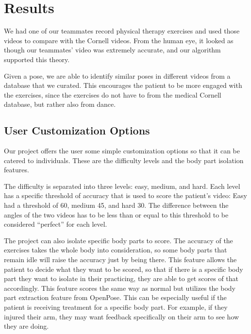 \section{Results}
\label{sec:results}

\indent We had one of our teammates record physical therapy exercises and used those videos to compare with 
the Cornell videos. From the human eye, it looked as though our teammates' video was extremely accurate, and 
our algorithm supported this theory.  

\indent Given a pose, we are able to identify similar poses in different videos from a database that we 
curated. This encourages the patient to be more engaged with the exercises, since the exercises do not have to 
 from the medical Cornell database, but rather also from dance.

\subsection{User Customization Options}
\indent Our project offers the user some simple customization options so that it can be catered to individuals. 
These are the difficulty levels and the body part isolation features.

\indent The difficulty is separated into three levels: easy, medium, and hard. Each level has a specific threshold 
of accuracy that is used to score the patient's video: Easy had a threshold of 60, medium 45, and hard 30. The 
difference between the angles of the two videos has to be less than or equal to this threshold to be considered “perfect” for each level. 

\indent The project can also isolate specific body parts to score. The accuracy of the exercises takes the whole body into consideration, 
so some body parts that remain idle will raise the accuracy just by being there. This feature allows the patient to decide 
what they want to be scored, so that if there is a specific body part they want to isolate in their practicing, they are 
able to get scores of that accordingly. This feature scores the same way as normal but utilizes the body part extraction feature 
from OpenPose. This can be especially useful if the patient is receiving treatment for a specific body part. For example, if 
they injured their arm, they may want feedback specifically on their arm to see how they are doing.
